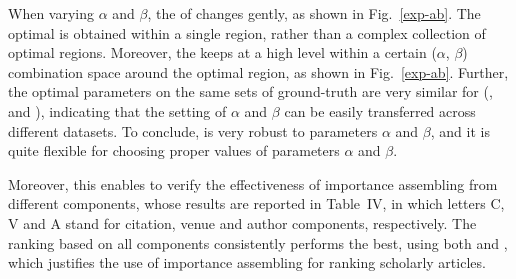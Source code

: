 When varying $\alpha$ and $\beta$, the \PairAcc of \ensemblerank changes gently, as shown in Fig.~\ref{exp-ab}.
The optimal \PairAcc is obtained within a single region, rather than a complex collection of optimal regions.
%
Moreover, the \PairAcc keeps at a high level within a certain ($\alpha$, $\beta$) combination space around the optimal region, as shown in Fig.~\ref{exp-ab}.
%
Further, the optimal parameters on the same sets of ground-truth are very similar for (\aan, \aminer and \magdata), indicating that the setting of $\alpha$ and $\beta$ can be easily transferred across different datasets.
To conclude, \ensemblerank is very robust to parameters $\alpha$ and $\beta$, and it is quite flexible for choosing proper values of parameters $\alpha$ and $\beta$.

Moreover, this enables to verify the effectiveness of importance assembling from different components, whose results are reported in Table~IV, in which letters C, V and A stand for citation, venue and author components, respectively.
The ranking based on all components consistently performs the best, using both \recom and \fcita, which justifies the use of importance assembling for ranking scholarly articles.





